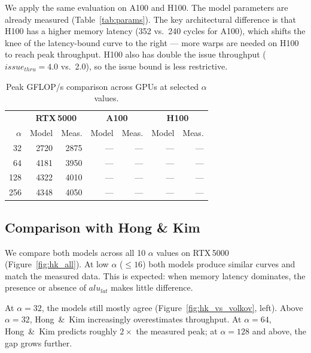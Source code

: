 We apply the same evaluation on A100 and H100.
The model parameters are already measured
(Table~\ref{tab:params}).
The key architectural difference is that H100 has a higher memory latency
(352 vs.\ 240 cycles for A100), which shifts the knee of the latency-bound
curve to the right --- more warps are needed on H100 to reach peak throughput.
H100 also has double the issue throughput ($issue_{thru} = 4.0$ vs.\ 2.0),
so the issue bound is less restrictive.

\begin{table}[t]
  \centering
  \caption{Peak GFLOP/s comparison across GPUs at selected $\alpha$ values.}
  \label{tab:cross_gpu}
  \begin{tabular}{r|rr|rr|rr}
    \toprule
    & \multicolumn{2}{c|}{\textbf{RTX\,5000}} &
      \multicolumn{2}{c|}{\textbf{A100}} &
      \multicolumn{2}{c}{\textbf{H100}} \\
    $\alpha$ & Model & Meas. & Model & Meas. & Model & Meas. \\
    \midrule
    32  & 2720  & 2875 & ---  & --- & --- & --- \\
    64  & 4181  & 3950 & ---  & --- & --- & --- \\
    128 & 4322  & 4010 & ---  & --- & --- & --- \\
    256 & 4348  & 4050 & ---  & --- & --- & --- \\
    \bottomrule
  \end{tabular}
\end{table}


\subsection{Comparison with Hong \& Kim}
\label{subsec:hk_comparison}

We compare both models across all 10 $\alpha$ values on RTX\,5000
(Figure~\ref{fig:hk_all}).
At low $\alpha$ ($\leq 16$) both models produce similar curves and match the
measured data.
This is expected: when memory latency dominates, the presence or absence of
$alu_{lat}$ makes little difference.

At $\alpha = 32$, the models still mostly agree (Figure~\ref{fig:hk_vs_volkov},
left).
Above $\alpha = 32$, Hong~\&~Kim increasingly overestimates throughput.
At $\alpha = 64$, Hong~\&~Kim predicts roughly $2\times$ the measured peak;
at $\alpha = 128$ and above, the gap grows further.

